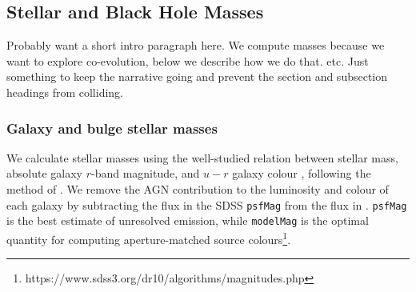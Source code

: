 \begin{figure}
\label{fig:redshifts}
\end{figure}






%
%
\subsection{Stellar and Black Hole Masses}\label{sec:masses}
%
%

{\notebsm Probably want a short intro paragraph here. We compute masses because we want to explore co-evolution, below we describe how we do that. etc. Just something to keep the narrative going and prevent the section and subsection headings from colliding.}

\subsubsection{Galaxy and bulge stellar masses}\label{sec:galmass}

We calculate stellar masses using the well-studied relation between stellar mass, absolute galaxy $r$-band magnitude, and $u-r$ galaxy colour {\notebsm \citep[corrected for galactic extinction;][]{schlegelmapsorwhatever}}, following the method of \citet{baldry06}. We remove the AGN contribution to the luminosity and colour of each galaxy by subtracting the flux in the SDSS {\tt psfMag} from the flux in {}. {\tt psfMag} is the best estimate of unresolved emission, while {\tt modelMag} is the optimal quantity for computing aperture-matched source colours\footnote{https://www.sdss3.org/dr10/algorithms/magnitudes.php}. 

